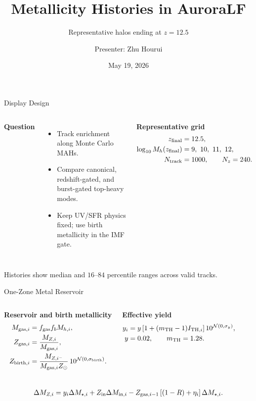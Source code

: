 \documentclass[aspectratio=169,10pt]{beamer}
\title{Metallicity Histories in AuroraLF}
\subtitle{Representative halos ending at \texorpdfstring{$z=12.5$}{z=12.5}}
\author{Presenter: Zhu Hourui}
\institute{AuroraLF}
\date{May 19, 2026}
\begin{document}
\begin{frame}
  \titlepage
\end{frame}

\begin{frame}{Display Design}
\begin{columns}[T]
\textbf{Question}
\begin{itemize}
\item Track enrichment along Monte Carlo MAHs.
\item Compare canonical, redshift-gated, and burst-gated top-heavy modes.
\item Keep UV/SFR physics fixed; use birth metallicity in the IMF gate.
\end{itemize}

\textbf{Representative grid}
\begin{align*}
z_{\rm final} &= 12.5,\\
\log_{10} M_h(z_{\rm final}) &= 9,\ 10,\ 11,\ 12,\\
N_{\rm track} &= 1000,\qquad N_z=240 .
\end{align*}
\end{columns}
\vspace{2mm}
\begin{center}
\small Histories show median and $16$--$84$ percentile ranges across valid tracks.
\end{center}
\end{frame}

\begin{frame}{One-Zone Metal Reservoir}
\begin{columns}[T]
\textbf{Reservoir and birth metallicity}
\begin{align*}
M_{{\rm gas},i} &= f_{\rm gas} f_b M_{h,i},\\
Z_{{\rm gas},i} &= \frac{M_{Z,i}}{M_{{\rm gas},i}},\\
Z_{{\rm birth},i} &=
\frac{M_{Z,i^-}}{M_{{\rm gas},i}Z_\odot}\,
10^{\mathcal{N}(0,\sigma_{\rm birth})}.
\end{align*}

\textbf{Effective yield}
\begin{align*}
y_i &= y
\left[1+(m_{\rm TH}-1)I_{{\rm TH},i}\right]
10^{\mathcal{N}(0,\sigma_y)},\\
y &=0.02,\qquad m_{\rm TH}=1.28 .
\end{align*}
\end{columns}
\vspace{1mm}
\begin{align*}
\Delta M_{Z,i} =
y_i\Delta M_{\star,i}
+Z_{\rm in}\Delta M_{{\rm in},i}
-Z_{{\rm gas},i-1}\left[(1-R)+\eta_i\right]\Delta M_{\star,i}.
\end{align*}
\end{frame}
\end{document}
